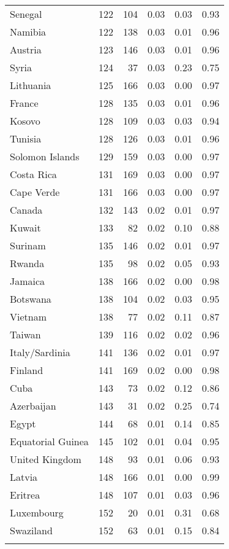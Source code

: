 \begin{longtable}[t]{lrrrrr}
\addlinespace
Senegal & 122 & 104 & 0.03 & 0.03 & 0.93\\
Namibia & 122 & 138 & 0.03 & 0.01 & 0.96\\
Austria & 123 & 146 & 0.03 & 0.01 & 0.96\\
Syria & 124 & 37 & 0.03 & 0.23 & 0.75\\
Lithuania & 125 & 166 & 0.03 & 0.00 & 0.97\\
\addlinespace
France & 128 & 135 & 0.03 & 0.01 & 0.96\\
Kosovo & 128 & 109 & 0.03 & 0.03 & 0.94\\
Tunisia & 128 & 126 & 0.03 & 0.01 & 0.96\\
Solomon Islands & 129 & 159 & 0.03 & 0.00 & 0.97\\
Costa Rica & 131 & 169 & 0.03 & 0.00 & 0.97\\
\addlinespace
Cape Verde & 131 & 166 & 0.03 & 0.00 & 0.97\\
Canada & 132 & 143 & 0.02 & 0.01 & 0.97\\
Kuwait & 133 & 82 & 0.02 & 0.10 & 0.88\\
Surinam & 135 & 146 & 0.02 & 0.01 & 0.97\\
Rwanda & 135 & 98 & 0.02 & 0.05 & 0.93\\
\addlinespace
Jamaica & 138 & 166 & 0.02 & 0.00 & 0.98\\
Botswana & 138 & 104 & 0.02 & 0.03 & 0.95\\
Vietnam & 138 & 77 & 0.02 & 0.11 & 0.87\\
Taiwan & 139 & 116 & 0.02 & 0.02 & 0.96\\
Italy/Sardinia & 141 & 136 & 0.02 & 0.01 & 0.97\\
\addlinespace
Finland & 141 & 169 & 0.02 & 0.00 & 0.98\\
Cuba & 143 & 73 & 0.02 & 0.12 & 0.86\\
Azerbaijan & 143 & 31 & 0.02 & 0.25 & 0.74\\
Egypt & 144 & 68 & 0.01 & 0.14 & 0.85\\
Equatorial Guinea & 145 & 102 & 0.01 & 0.04 & 0.95\\
\addlinespace
United Kingdom & 148 & 93 & 0.01 & 0.06 & 0.93\\
Latvia & 148 & 166 & 0.01 & 0.00 & 0.99\\
Eritrea & 148 & 107 & 0.01 & 0.03 & 0.96\\
Luxembourg & 152 & 20 & 0.01 & 0.31 & 0.68\\
Swaziland & 152 & 63 & 0.01 & 0.15 & 0.84\\
\addlinespace

\end{longtable}
